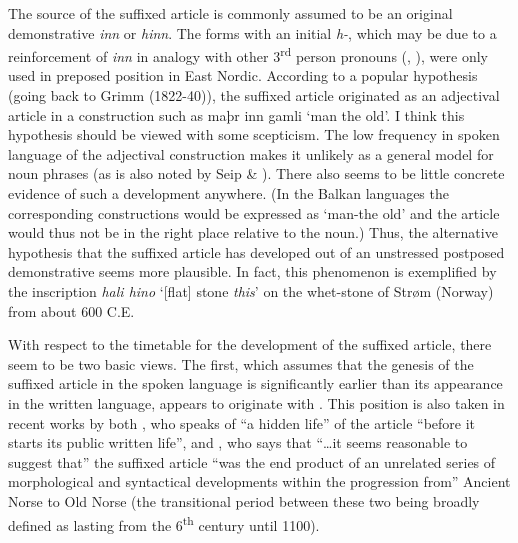 \begin{styleBodyTextFirst}
The source of the suffixed article is commonly assumed to be an original demonstrative \textit{inn} or \textit{hinn}. The forms with an initial \textit{h-}, which may be due to a reinforcement of \textit{inn} in analogy with other 3\textsuperscript{rd} person pronouns (\citet[135]{Perridon1989}, \citet[723]{Syrett2002}), were only used in preposed position in East Nordic. According to a popular hypothesis (going back to Grimm (1822-40)), the suffixed article originated as an adjectival article in a construction such as maþr inn gamli ‘man the old’. I think this hypothesis should be viewed with some scepticism. The low frequency in spoken language of the adjectival construction makes it unlikely as a general model for noun phrases (as is also noted by Seip \& \citet[63]{Saltveit1971}). There also seems to be little concrete evidence of such a development anywhere. (In the Balkan languages the corresponding constructions would be expressed as ‘man-the old’ and the article would thus not be in the right place relative to the noun.)  Thus, the alternative hypothesis that the suffixed article has developed out of an unstressed postposed demonstrative seems more plausible.  In fact, this phenomenon is exemplified by the inscription \textit{hali hino} ‘[flat] stone \textit{this}’ on the whet-stone of Strøm (Norway) from about 600 C.E. 

\end{styleBodyTextFirst}

\begin{styleBodytextC}
With respect to the timetable for the development of the suffixed article, there seem to be two basic views. The first, which assumes that the genesis of the suffixed article in the spoken language is significantly earlier than its appearance in the written language, appears to originate with \citet{Neckel1924}.  This position is also taken in recent works by both \citet[142]{Perridon1989}, who speaks of “a hidden life” of the article “before it starts its public written life”, and \citet[723]{Syrett2002}, who says that “…it seems reasonable to suggest that” the suffixed article “was the end product of an unrelated series of morphological and syntactical developments within the progression from” Ancient Norse to Old Norse (the transitional period between these two being broadly defined as lasting from the 6\textsuperscript{th} century until 1100). 

\end{styleBodytextC}

